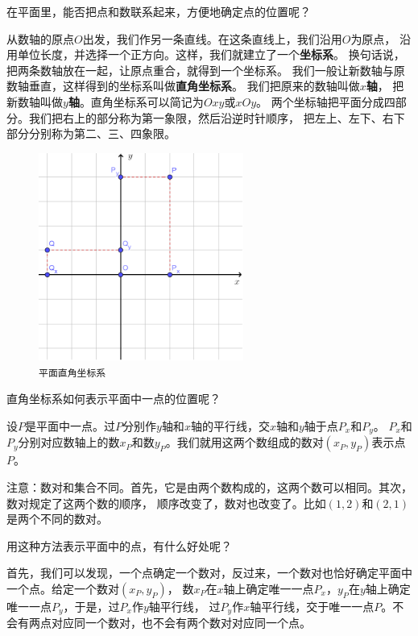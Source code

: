 \documentclass[12pt,UTF8]{ctexbook}
\begin{document}
在平面里，能否把点和数联系起来，方便地确定点的位置呢？

从数轴的原点$O$出发，我们作另一条直线。在这条直线上，我们沿用$O$为原点，
沿用单位长度，并选择一个正方向。这样，我们就建立了一个\textbf{坐标系}。
换句话说，把两条数轴放在一起，让原点重合，就得到一个坐标系。
我们一般让新数轴与原数轴垂直，这样得到的坐标系叫做\textbf{直角坐标系}。
我们把原来的数轴叫做$x$\textbf{轴}，
把新数轴叫做$y$\textbf{轴}。直角坐标系可以简记为$Oxy$或$xOy$。
两个坐标轴把平面分成四部分。我们把右上的部分称为第一象限，然后沿逆时针顺序，
把左上、左下、右下部分分别称为第二、三、四象限。

\begin{figure} %
    \vspace{-30pt}
    \centering
    \includegraphics[width=0.6\textwidth]{tu/坐标系2.png}
    \caption*{\texttt{平面直角坐标系}}
\end{figure}

直角坐标系如何表示平面中一点的位置呢？

设$P$是平面中一点。过$P$分别作$y$轴和$x$轴的平行线，交$x$轴和$y$轴于点$P_x$和$P_y$。
$P_x$和$P_y$分别对应数轴上的数$x_P$和数$y_P$。我们就用这两个数组成的数对$(x_P, y_P)$表示点$P$。

注意：数对和集合不同。首先，它是由两个数构成的，这两个数可以相同。其次，数对规定了这两个数的顺序，
顺序改变了，数对也改变了。比如$(1,2)$和$(2,1)$是两个不同的数对。

用这种方法表示平面中的点，有什么好处呢？

首先，我们可以发现，一个点确定一个数对，反过来，一个数对也恰好确定平面中一个点。给定一个数对$(x_P, y_P)$，
数$x_P$在$x$轴上确定唯一一点$P_x$，$y_P$在$y$轴上确定唯一一点$P_y$，于是，过$P_x$作$y$轴平行线，
过$P_y$作$x$轴平行线，交于唯一一点$P$。不会有两点对应同一个数对，也不会有两个数对对应同一个点。
\end{document}
